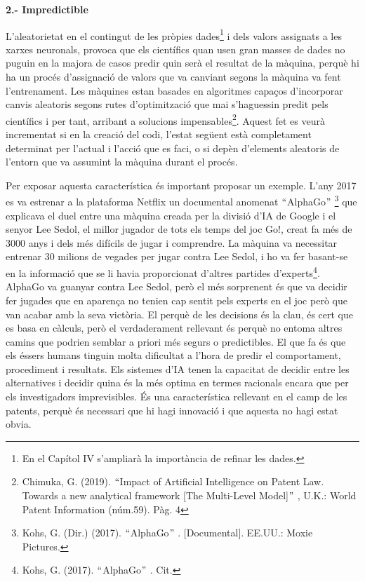 \documentclass[12pt]{article}
\renewcommand{\_}{\kern-1.5pt\textunderscore\kern-1.5pt}
\begin{document}
\begin{itemize}
\vspace{\baselineskip}
\textbf{2.- Impredictible}\par


\vspace{\baselineskip}
L’aleatorietat en el contingut de les pròpies dades\footnote{ En el Capítol IV s’ampliarà la importància de refinar les dades. } i dels valors assignats a les xarxes neuronals, provoca que els científics quan usen gran masses de dades no puguin en la majora de casos predir quin serà el resultat de la màquina, perquè hi ha un procés d’assignació de valors que va canviant segons la màquina va fent l’entrenament. Les màquines estan basades en algoritmes capaços d’incorporar canvis aleatoris segons rutes d’optimització que mai s’haguessin predit pels científics i per tant, arribant a solucions impensables\footnote{ Chimuka, G. (2019). $``$Impact of Artificial Intelligence on Patent Law. Towards a new analytical framework [The Multi-Level Model]$"$ , U.K.: World Patent Information (núm.59). Pàg. 4 }. Aquest fet es veurà incrementat si en la creació del codi, l’estat següent està completament determinat per l’actual i l’acció que es faci, o si depèn d’elements aleatoris de l’entorn que va assumint la màquina durant el procés. \par


\vspace{\baselineskip}
Per exposar aquesta característica és important proposar un exemple. L’any 2017 es va estrenar a la plataforma Netflix un documental anomenat $``$AlphaGo$"$ \footnote{ Kohs, G. (Dir.) (2017). $``$AlphaGo$"$ . [Documental]. EE.UU.: Moxie Pictures.  } que explicava el duel entre una màquina creada per la divisió d’IA de Google i el senyor Lee Sedol, el millor jugador de tots els temps del joc Go!, creat fa més de 3000 anys i dels més difícils de jugar i comprendre. La màquina va necessitar entrenar 30 milions de vegades per jugar contra Lee Sedol, i ho va fer basant-se en la informació que se li havia proporcionat d’altres partides d’experts\footnote{ Kohs, G. (2017). $``$AlphaGo$"$ . Cit.  }. AlphaGo va guanyar contra Lee Sedol, però el més sorprenent és que va decidir fer jugades que en aparença no tenien cap sentit pels experts en el joc però que van acabar amb la seva victòria. El perquè de les decisions és la clau, és cert que es basa en càlculs, però el verdaderament rellevant és perquè no entoma altres camins que podrien semblar a priori més segurs o predictibles. El que fa és que els éssers humans tinguin molta dificultat a l’hora de predir el comportament, procediment i resultats. Els sistemes d’IA tenen la capacitat de decidir entre les alternatives i decidir quina és la més optima en termes racionals encara que per els investigadors imprevisibles. És una característica rellevant en el camp de les patents, perquè és necessari que hi hagi innovació i que aquesta no hagi estat obvia.\par



\end{itemize}
\end{document}
